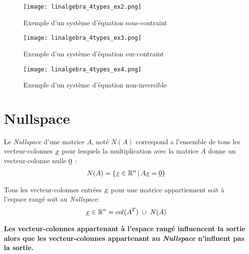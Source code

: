 \begin{figure}[htp]
	\centering
		\texttt{[image: linalgebra\_4types\_ex2.png]}
	\caption{Exemple d'un système d'équation sous-contraint}
	\label{fig:rmn_ex2}
\end{figure}

\begin{figure}[htp]
	\centering
		\texttt{[image: linalgebra\_4types\_ex3.png]}
	\caption{Exemple d'un système d'équation sur-contraint}
	\label{fig:rmn_ex3}
\end{figure}

\begin{figure}[htp]
	\centering
		\texttt{[image: linalgebra\_4types\_ex4.png]}
	\caption{Exemple d'un système d'équation non-inversible}
	\label{fig:rmn_ex4}
\end{figure}


\newpage
\section{Nullspace}
\label{sec:nullspace}

Le \textit{Nullspace} d'une matrice $A$, noté $N(A)$ correspond a l'ensemble de tous les vecteur-colonnes $\underline{x}$ pour lesquels la multiplication avec la matrice $A$ donne un vecteur-colonne nulle $\underline{0}$ :
\begin{align}
N(A) = \left\{ \underline{x} \in \mathbb{R}^n \,|\, A\underline{x} = \underline{0} \right\}
\end{align}

Tous les vecteur-colonnes entrées $\underline{x}$ pour une matrice appartiennent soit à l'espace rangé soit au \textit{Nullspace}:
\begin{align}
\col{x} \in \re^n = col(A^T) \; \cup \; N(A) %
\end{align}

\textbf{Les vecteur-colonnes appartenant à l'espace rangé influencent la sortie alors que les vecteur-colonnes appartenant au \textit{Nullspace} n'influent pas la sortie.} 

